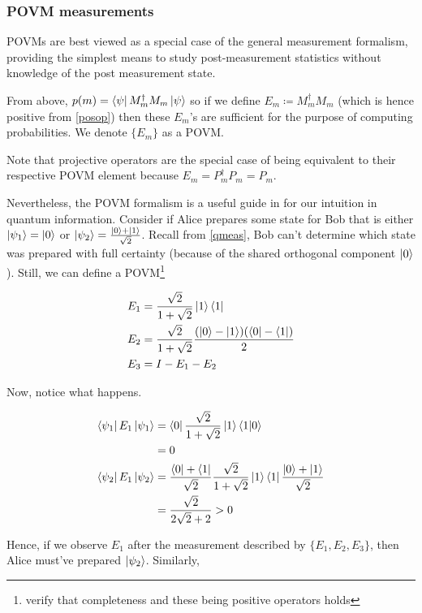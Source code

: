 \documentclass[11pt]{article}
\newcommand\0{\mathbf{0}}
\newcommand\<{\langle}
\renewcommand\>{\rangle}
\begin{document}
\subsubsection{POVM measurements}\label{povm}

POVMs are best viewed as a special case of the general measurement formalism, providing the simplest means to study post-measurement statistics without knowledge of the post measurement state.

From above, $p(m) = \bra{\psi} M_m^\dagger M_m \ket{\psi}$ so if we define $E_m \coloneqq M_m^\dagger M_m$ (which is hence positive from \ref{posop}) then these $E_m$'s are sufficient for the purpose of computing probabilities. We denote $\{ E_m \}$ as a POVM. 

Note that projective operators are the special case of being equivalent to their respective POVM element because $E_m = P_m^\dag P_m = P_m$. 

Nevertheless, the POVM formalism is a useful guide in for our intuition in quantum information. Consider if Alice prepares some state for Bob that is either $\ket{\psi_1} = \ket{0}$ or $\ket{\psi_2} = \frac{\ket{0} + \ket{1}}{\sqrt{2}}$. Recall from \ref{qmeas}, Bob can't determine which state was prepared with full certainty (because of the shared orthogonal component $\ket{0}$). Still, we can define a POVM\footnote{verify that completeness and these being positive operators holds}

\begin{align*}
E_1 &= \frac{\sqrt{2}}{1+\sqrt{2}}\ket{1}\bra{1}	\\
E_2 &= \frac{\sqrt{2}}{1+\sqrt{2}}\frac{(\ket{0} - \ket{1})(\bra{0} - \bra{1})}{2} \\
E_3 &= I - E_1 - E_2
\end{align*}

Now, notice what happens. 

\begin{align*}
\bra{\psi_1} E_1 \ket{\psi_1} &= \bra{0} \frac{\sqrt{2}}{1+\sqrt{2}}\ket{1}\bra{1}\ket{0} \\
	&= 0 \\
\bra{\psi_2} E_1 \ket{\psi_2} &= \frac{\bra{0} + \bra{1}}{\sqrt{2}}\frac{\sqrt{2}}{1+\sqrt{2}}\ket{1}\bra{1}\frac{\ket{0} + \ket{1}}{\sqrt{2}} \\
	&= \frac{\sqrt{2}}{2\sqrt{2} + 2} > 0 
\end{align*}

Hence, if we observe $E_1$ after the measurement described by $\{ E_1, E_2, E_3 \}$, then Alice must've prepared $\ket{\psi_2}$. Similarly,
\end{document}
